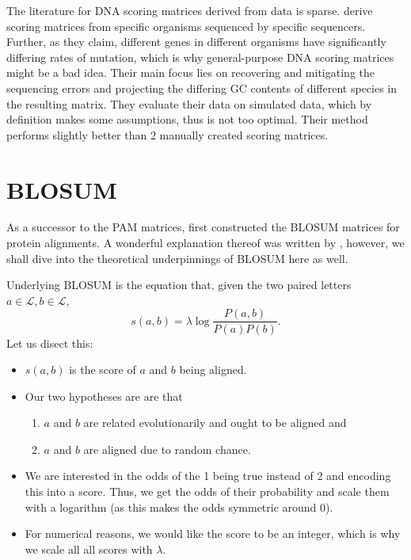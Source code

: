 \documentclass{article}
\begin{document}
The literature for DNA scoring matrices derived from data is sparse. \textcite{hamadaTrainingAlignmentParameters2017}
derive scoring matrices from specific organisms sequenced by specific sequencers. Further, as they claim,
different genes in different organisms have significantly differing rates of mutation, which is why
general-purpose DNA scoring matrices might be a bad idea. Their main focus lies on recovering and mitigating the sequencing errors
and projecting the differing GC contents of different species in the resulting matrix. They evaluate their data on simulated data,
which by definition makes some assumptions, thus is not too optimal. Their method performs slightly better than
2 manually created scoring matrices.

\section{BLOSUM}
As a successor to the PAM matrices, \textcite{henikoffAminoAcidSubstitution1992} first constructed the BLOSUM matrices for protein alignments. A wonderful explanation thereof was written by \textcite{eddyWhereDidBLOSUM622004}, however, we shall dive into the theoretical underpinnings of BLOSUM here as well.

Underlying BLOSUM is the equation that, given the two paired letters $a \in \mathcal L, b \in \mathcal L$,
\begin{equation*}
    s(a, b)= \lambda \log \frac{P(a, b)}{P(a)P(b)}.
\end{equation*}
Let us disect this:
\begin{itemize}
    \item $s(a, b)$ is the score of $a$ and $b$ being aligned.
    \item Our two hypotheses are are that
          \begin{enumerate}
              \item $a$ and $b$ are related evolutionarily and ought to be aligned and
              \item $a$ and $b$ are aligned due to random chance.
          \end{enumerate}
    \item We are interested in the odds of the 1 being true instead of 2
          and encoding this into a score. Thus, we get the odds of their probability and scale them with a logarithm (as this makes the
          odds symmetric around 0).
    \item For numerical reasons, we would like the score to be an integer,
          which is why we scale all all scores with $\lambda$.
\end{itemize}


\printbibliography
\end{document}
